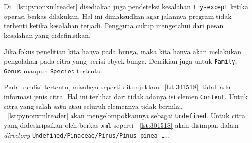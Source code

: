 \scriptsize

\normalsize

Di \lstlistingname~\ref{lst:pynonxmlreader} disediakan juga pendeteksi kesalahan \texttt{try-except} ketika operasi berkas dilakukan. Hal ini dimaksudkan agar jalannya program tidak terhenti ketika kesalahan terjadi. Pengguna cukup mengetahui dari pesan kesalahan yang didefinisikan.

Jika fokus penelitian kita hanya pada bunga, maka kita hanya akan melakukan pengolahan pada citra yang berisi obyek bunga. Demikian juga untuk \texttt{Family}, \texttt{Genus} maupun \texttt{Species} tertentu.

Pada kondisi tertentu, misalnya seperti ditunjukkan \lstlistingname~\ref{lst:301518}, tidak ada informasi jenis citra. Hal ini terlihat dari tidak adanya isi elemen \texttt{Content}. Untuk citra yang salah satu atau seluruh elemennya tidak bernilai, \lstlistingname~\ref{lst:pynonxmlreader} akan mengelompokkannya sebagai \texttt{Undefined}. Untuk citra yang dideskripsikan oleh berkas \texttt{xml} seperti \lstlistingname~\ref{lst:301518} akan disimpan dalam \textit{directory} \texttt{Undefined/Pinaceae/Pinus/Pinus\ pinea\ L.}.

\scriptsize

\normalsize
